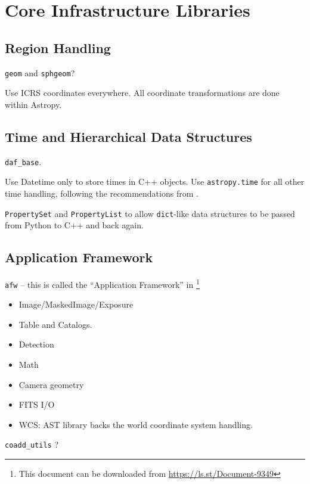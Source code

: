 \section{Core Infrastructure Libraries}

\subsection{Region Handling}

\texttt{geom} and \texttt{sphgeom}?

Use ICRS coordinates everywhere.
All coordinate transformations are done within Astropy.

\subsection{Time and Hierarchical Data Structures}

\texttt{daf\_base}.

Use Datetime only to store times in C++ objects.
Use \texttt{astropy.time} for all other time handling, following the recommendations from \citet{2016SPIE.9913E..0GJ}.

\texttt{PropertySet} and \texttt{PropertyList} to allow \texttt{dict}-like data structures to be passed from Python to C++ and back again.

\subsection{Application Framework}
\label{sec:afw}
\texttt{afw} -- this is called the ``Application Framework'' in \citet{2010SPIE.7740E..15A}\footnote{This document can be downloaded from \url{https://ls.st/Document-9349}}

\begin{itemize}
\item Image/MaskedImage/Exposure
\item Table and Catalogs.
\item Detection
\item Math
\item Camera geometry
\item FITS I/O
\item WCS: AST library \citep{2016A&C....15...33B} backs the world coordinate system handling.
\end{itemize}

\texttt{coadd\_utils} ?
